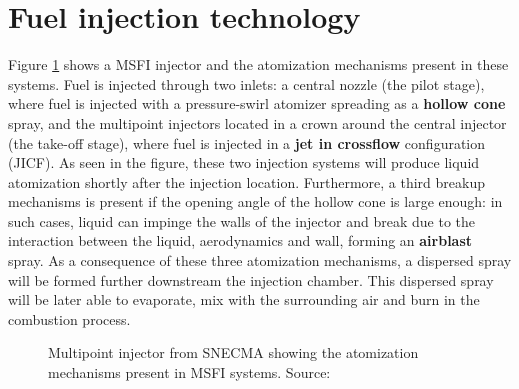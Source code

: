 \section{Fuel injection technology}
\label{sec:ch1_fuel_injection_technology}

Figure \ref{fig:multipoint_injector_snecma} shows a MSFI injector and the atomization mechanisms present in these systems. Fuel is injected through two inlets: a central nozzle (the pilot stage), where fuel is injected with a pressure-swirl atomizer spreading as a \textbf{hollow cone} spray, and the multipoint injectors located in a crown around the central injector (the take-off stage), where fuel is injected in a \textbf{jet in crossflow} configuration (JICF). As seen in the figure, these two injection systems will produce liquid atomization shortly after the injection location. Furthermore, a third breakup mechanisms is present if the opening angle of the hollow cone is large enough: in such cases, liquid can impinge the walls of the injector and break due to the interaction between the liquid, aerodynamics and wall, forming an \textbf{airblast} spray. As a consequence of these three atomization mechanisms, a dispersed spray will be formed further downstream the injection chamber. This dispersed spray will be later able to evaporate, mix with the surrounding air and burn in the combustion process.




\begin{figure}[ht]
     \centering
      \caption[Multipoint injector from SNECMA showing the atomization mechanisms present in MSFI systems]{Multipoint injector from SNECMA showing the atomization mechanisms present in MSFI systems. Source: }
      \label{fig:multipoint_injector_snecma}
\end{figure}

